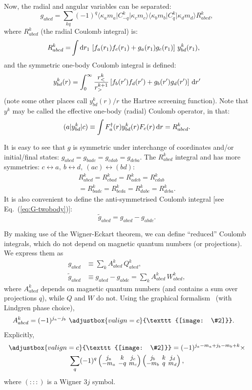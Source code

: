 \documentclass[10pt,twocolumn,a4paper]{article}%
\newcommand{\eqdiagram}[2]{\adjustbox{valign=c}{\texttt{[image: \#2]}}}
\newcommand{\bra}[1]{\ensuremath{\langle #1|}}	%
\newcommand{\ket}[1]{\ensuremath{|#1\rangle}}
\newcommand{\threej}[6]{
\renewcommand\arraystretch{0.75}\setlength\arraycolsep{2pt}
\small\ensuremath{\begin{pmatrix}#1&#2&#3\\#4&#5&#6\end{pmatrix}}
}	%
\newcommand{\be}{\begin{equation}}
\newcommand{\ee}{\end{equation}}
\def\d{\ensuremath{{\rm d}}}
\renewcommand{\k}{\ensuremath{\kappa}}
\begin{document}
Now, the radial and angular variables can be separated:
\begin{equation}\label{eq:gabcd2}
g_{abcd} = \sum_{kq} (-1)^q \bra{\k_a m_a}C^k_{-q}\ket{\k_c m_c} \bra{\k_b m_b}C^k_{q}\ket{\k_d m_d} R^k_{abcd},
\end{equation}
where $R^k_{abcd}$ (the radial Coulomb integral) is:
\begin{align}
R^k_{abcd} =& \int\d r_1 \, \left[f_a(r_1)f_c(r_1) + g_a(r_1)g_c(r_1)\right]\, y^k_{bd}(r_1),
\end{align}
and the symmetric one-body Coulomb integral is defined:
\be
y^k_{bd}(r) = \int_0^\infty \frac{r_<^k}{r_>^{k+1}}\left[f_b(r') f_d(r') + g_b(r') g_d(r')\right]\, \d r'
\ee
(note some other places call $y^k_{bd}(r)/r$ the Hartree screening function).
Note that $y^k$ may be called the effective one-body (radial) Coulomb operator, in that:
\be
({a}|y^{k}_{bd}|{c}) \equiv
\int F_a^\dag(r) y^{k}_{bd}(r) {F_c}(r)\,\d r =
R^k_{abcd}.
\ee

It is easy to see that $g$ is symmetric under interchange of coordinates and/or  initial/final states:
$g_{abcd} = g_{badc} = g_{cdab} = g_{dcba}$.
The $R^k_{abcd}$ integral and has more symmetries: $c\leftrightarrow a ,~ b\leftrightarrow d  ,~ (ac)\leftrightarrow (bd)$:
\begin{multline}
 R^k_{abcd} =R^k_{cbad} =R^k_{adcb} =R^k_{cdab} \\=R^k_{badc} =R^k_{bcda} =R^k_{dabc} =R^k_{dcba}.
\end{multline}
It is also convenient to define the anti-symmetrised Coulomb integral [see Eq.~(\ref{eq:G-twobody})]:
\be
 \widetilde g_{abcd} =  g_{abcd} -  g_{abdc}.
\ee


By making use of the Wigner-Eckart theorem, we can define ``reduced'' Coulomb integrals, which do not depend on magnetic quantum numbers (or projections).
%
We express them as
\begin{align}\label{eq:reduced-Coulomb}
g_{abcd} &\equiv \sum_{k} A^k_{abcd} \, Q^k_{abcd},\\
\widetilde g_{abcd} &\equiv g_{abcd} - g_{abdc} = \sum_{k} A^k_{abcd} \, W^k_{abcd},\label{eq:g-angred-2}
\end{align}
where $A^k_{abcd}$ depends on magnetic quantum numbers (and contains a sum over projections $q$), while $Q$ and $W$ do not.
Using the graphical formalism~\cite{Lindgren1986} (with Lindgren phase choice),
\begin{align}
A^k_{abcd} &= (-1)^{j_a-j_b} \,\,\eqdiagram{0.16}{img/angles/CK_abcd}.
\end{align}
Explicitly,
\begin{multline}
 \eqdiagram{0.16}{img/angles/CK_abcd} = 
 (-1)^{j_a-m_a+j_b-m_b+k} 
 \times \\
\sum_{q}(-1)^{q}\threej{j_a}{k}{j_c}{-m_a}{-q}{m_c}\threej{j_b}{k}{j_d}{-m_b}{q}{m_d},
\end{multline}
where $(:::)$ is a Wigner 3$j$ symbol.
\end{document}
